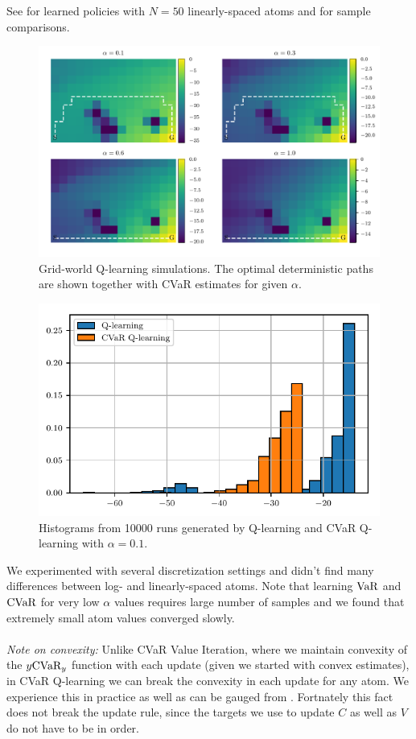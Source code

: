 See  for learned policies with $N=50$ linearly-spaced atoms and  for sample comparisons.

\begin{figure}[h]
\center
\includegraphics[width=\linewidth]{gfx/q_optimal_paths.pdf}
\caption{Grid-world Q-learning simulations. The optimal deterministic paths are shown together with CVaR estimates for given $\alpha$.}
\label{fig:qgrid}
\end{figure}


\begin{figure}[h]
\center
\includegraphics[width=0.6\linewidth]{gfx/sample_hist.pdf}
\caption{Histograms from 10000 runs generated by Q-learning and CVaR Q-learning with $\alpha=0.1$.}
\label{fig:qhist}
\end{figure}

We experimented with several discretization settings and didn't find many differences between log- and linearly-spaced atoms. Note that learning $\text{VaR}$ and $\text{CVaR}$ for very low $\alpha$ values requires large number of samples and we found that extremely small atom values converged slowly.
\\
\\
\textit{Note on convexity:} Unlike CVaR Value Iteration, where we maintain convexity of the $y\text{CVaR}_y$ function with each update (given we started with convex estimates), in CVaR Q-learning we can break the convexity in each update for any atom. We experience this in practice as well as can be gauged from . Fortnately this fact does not break the update rule, since the targets we use to update $C$ as well as $V$ do not have to be in order.


